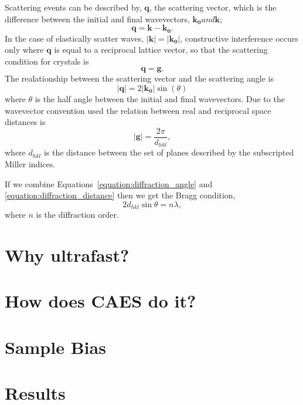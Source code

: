 Scattering events can be described by, $\mathbf{q}$, the scattering vector, which is the difference between the initial and final wavevectors, $\mathbf{k_0} and \mathbf{k}$;
\begin{equation}
\mathbf{q} = \mathbf{k} - \mathbf{k_0}.
\end{equation}
In the case of elastically scatter waves, $|\mathbf{k}| = |\mathbf{k_0}|$, constructive interference occurs only where $\mathbf{q}$ is equal to a reciprocal lattice vector, so that the scattering condition for crystals is
\begin{equation}
\mathbf{q} = \mathbf{g}.
\end{equation}
The realationship between the scattering vector and the scattering angle is
\begin{equation}\label{equation:diffraction_angle}
|\mathbf{q}| = 2|\mathbf{k_0}|\sin(\theta)
\end{equation}
where $\theta$ is the half angle between the initial and final wavevectors.
Due to the wavevector convention used the relation between real and reciprocal space distances is
\begin{equation}\label{equation:diffraction_distance}
|\mathbf{g}| = \frac{2\pi}{d_{hkl}},
\end{equation}
where $d_{hkl}$ is the distance between the set of planes described by the subscripted Miller indices.

If we combine Equations~\ref{equation:diffraction_angle} and \ref{equation:diffraction_distance} then we get the Bragg condition,
\begin{equation}
2d_{hkl}\sin\theta = n\lambda,
\end{equation}
where $n$ is the diffraction order.

\section{Why ultrafast?}

\section{How does CAES do it?}

\section{Sample Bias}\label{section:sample_bias}

\section{Results}

